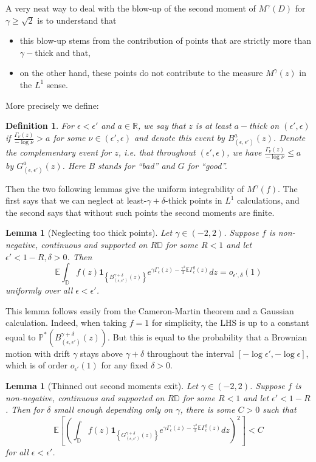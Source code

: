 \documentclass[11pt]{amsart}
\newtheorem{lemma}[thm]{Lemma}
\newtheorem{defn}[thm]{Definition}
\newcommand{\R}{\mathbb R}
\newcommand{\D}{\mathbb D}
\newcommand{\E}{\mathbb E}
\newcommand{\I}[1]{\mathbf{1}_{\left \{#1\right \}}}
\renewcommand{\P}{\mathbb P}
\renewcommand{\1}{\mathbf 1}
\newcommand{\eps}{\epsilon}
\begin{document}
A very neat way to deal with the blow-up of the second moment of $M^\gamma(D)$ for $\gamma \geq \sqrt{2}$ is to understand that 
\begin{itemize}
\item this blow-up stems from the contribution of points that are strictly more than $\gamma-$thick and that, 
\item on the other hand, these points do not contribute to the measure $M^\gamma(z)$ in the $L^1$ sense. 
\end{itemize}
More precisely we define:
\begin{defn}
For $\eps < \eps'$ and $a \in \R$, we say that $z$ is at least $a-$thick on $(\eps',\eps)$ if $\frac{\Gamma_\nu(z)}{-\log \nu} > a$ for some $\nu \in (\eps',\eps)$ and denote this event by $B^a_{(\eps, \eps')}(z)$. Denote the complementary event for $z$, i.e. that throughout $(\eps',\eps)$, we have $\frac{\Gamma_\nu(z)}{-\log \nu} \leq a$ by $G^a_{(\eps, \eps')}(z)$. Here $B$ stands for ``bad'' and $G$ for ``good''.
\end{defn}

Then the two following lemmas give the uniform integrability of $M^\gamma(f)$. The first says that we can neglect at least-$\gamma+\delta$-thick points in $L^1$ calculations, and the second says that without such points the second moments are finite.

\begin{lemma}[Neglecting too thick points]\label{lem:1pt}
Let $\gamma \in (-2,2)$. Suppose $f$ is non-negative, continuous and supported on $R\D$ for some $R < 1$ and let $\eps' < 1-R, \delta > 0$. Then 
$$\E \int_\D f(z)\I{B^{\gamma+\delta}_{(\eps, \eps')}(z)}e^{\gamma \Gamma_\eps(z) - \frac{\gamma^2}{2}\E \Gamma_\eps^2(z)}dz = o_{\eps',\delta}(1)$$
uniformly over all $\eps < \eps'$.
\end{lemma}

This lemma follows easily from the Cameron-Martin theorem and a Gaussian calculation. Indeed, when taking $f = 1$ for simplicity, the LHS is up to a constant equal to $\P^*(B^{\gamma+\delta}_{(\eps, \eps')}(z)).$
But this is equal to the probability that a Brownian motion with drift $\gamma$ stays above $\gamma + \delta$ throughout the interval $[-\log \eps', -\log \eps]$, which is of order $o_{\eps'}(1)$ for any fixed $\delta > 0$.

\begin{lemma}[Thinned out second moments exit]\label{lem:2ndme}
Let $\gamma \in (-2,2)$. Suppose $f$ is non-negative, continuous and supported on $R\D$ for some $R < 1$ and let $\eps' < 1-R$. Then for $\delta$ small enough depending only on $\gamma$, there is some $C > 0$ such that
$$\E \left[(\int_\D f(z)\I{G^{\gamma+\delta}_{(\eps, \eps')}(z)}e^{\gamma \Gamma_\eps(z) - \frac{\gamma^2}{2}\E \Gamma_\eps^2(z)}dz)^2\right] < C$$
for all $\eps < \eps'$.
\end{lemma}
\end{document}
